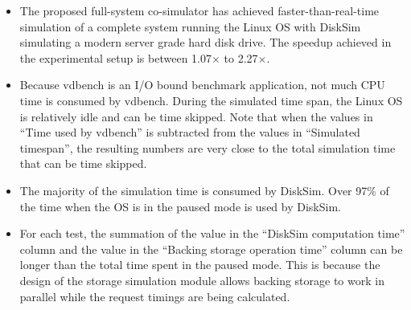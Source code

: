 \begin{itemize}
	\item The proposed full-system co-simulator has achieved faster-than-real-time simulation of a complete system running the Linux OS with DiskSim simulating a modern server grade hard disk drive. The speedup achieved in the experimental setup is between 1.07$\times$ to 2.27$\times$.
	
	\item Because vdbench is an I/O bound benchmark application, not much CPU time is consumed by vdbench. During the simulated time span, the Linux OS is relatively idle and can be time skipped. Note that when the values in ``Time used by vdbench'' is subtracted from  the values in ``Simulated timespan'', the resulting numbers are very close to the total simulation time that can be time skipped.
	
	\item The majority of the simulation time is consumed by DiskSim. Over 97\% of the time when the OS is in the paused mode is used by DiskSim.
	
	\item For each test, the summation of the value in the ``DiskSim computation time'' column and the value in the ``Backing storage operation time'' column can be longer than the total time spent in the paused mode. This is because the design of the storage simulation module allows backing storage to work in parallel while the request timings are being calculated.
\end{itemize}

